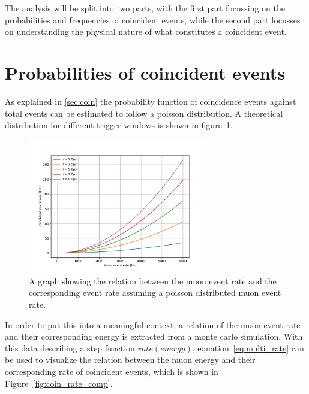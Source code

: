 The analysis will be split into two parts, with the first part focussing on the probabilities and frequencies of coincident events, while the second part 
focusses on understanding the physical nature of what constitutes a coincident event. 

\section{Probabilities of coincident events}\label{sec:muon_coincidence}

As explained in \ref{sec:coin} the probability function of coincidence events against total events can be estimated to follow a poisson distribution.
A theoretical distribution for different trigger windows is shown in figure~\ref{fig:coin_rate_rate}. 

\begin{figure}
    \centering
    \includegraphics[width=0.7\textwidth]{Plots/coincidence_rate_poisson.pdf}
    \caption{A graph showing the relation between the muon event rate and the corresponding event rate assuming a poisson distributed muon event rate.}
    \label{fig:coin_rate_rate}
\end{figure}

In order to put this into a meaningful context, a relation of the muon event rate and their corresponding energy is extracted from a monte carlo simulation.
With this data describing a step function $rate(energy)$, equation~\ref{eq:multi_rate} can be used to visualize the relation between the muon energy and their 
corresponding rate of coincident events, which is shown in Figure~\ref{fig:coin_rate_comp}.

